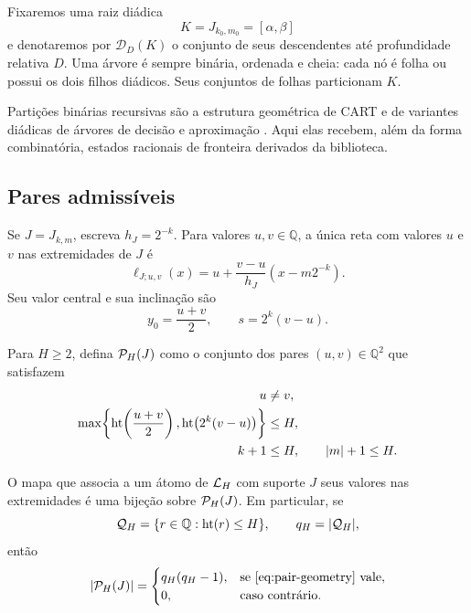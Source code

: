 Fixaremos uma raiz diádica
\[
 K=J_{k_0,m_0}=[\alpha,\beta]
\]
e denotaremos por $\mathcal D_D(K)$ o conjunto de seus descendentes até
profundidade relativa $D$. Uma árvore é sempre binária, ordenada e cheia:
cada nó é folha ou possui os dois filhos diádicos. Seus conjuntos de folhas
particionam $K$.

Partições binárias recursivas são a estrutura geométrica de CART e de variantes
diádicas de árvores de decisão e aproximação
\citep{breiman1984,donoho1997,blanchard2007}. Aqui elas recebem, além da forma
combinatória, estados racionais de fronteira derivados da biblioteca.

\subsection{Pares admissíveis}

Se $J=J_{k,m}$, escreva $h_J=2^{-k}$. Para valores $u,v\in\mathbb Q$, a única
reta com valores $u$ e $v$ nas extremidades de $J$ é
\begin{equation}
 \ell_{J;u,v}(x)
 =u+\frac{v-u}{h_J}(x-m2^{-k}).
 \label{eq:endpoint-line}
\end{equation}
Seu valor central e sua inclinação são
\[
 y_0=\frac{u+v}{2},
 \qquad s=2^k(v-u).
\]

\begin{definition}
\label{def:admissible-pairs}
Para $H\ge2$, defina $\mathcal{P}_H(J)$ como o conjunto dos pares
$(u,v)\in\mathbb Q^2$ que satisfazem
\begin{align}
 u&\ne v,\label{eq:pair-nonzero}\\
 \max\!\left\{\operatorname{ht}\!\left(\frac{u+v}{2}\right),
 \operatorname{ht}\!\left(2^k(v-u)\right)\right\}&\le H,\label{eq:pair-arithmetic}\\
 k+1&\le H,\qquad |m|+1\le H.\label{eq:pair-geometry}
\end{align}
\end{definition}

\begin{proposition}
\label{prop:endpoint-dictionary}
O mapa que associa a um átomo de $\mathcal{L}_H$ com suporte $J$ seus valores
nas extremidades é uma bijeção sobre $\mathcal{P}_H(J)$. Em particular, se
\[
 \mathcal Q_H=\{r\in\mathbb Q:\operatorname{ht}(r)\le H\},
 \qquad q_H=|\mathcal Q_H|,
\]
então
\begin{equation}
 |\mathcal{P}_H(J)|=
 \begin{cases}
 q_H(q_H-1),&\text{se \eqref{eq:pair-geometry} vale},\\
 0,&\text{caso contrário}.
 \end{cases}
 \label{eq:pair-count}
\end{equation}
\end{proposition}

